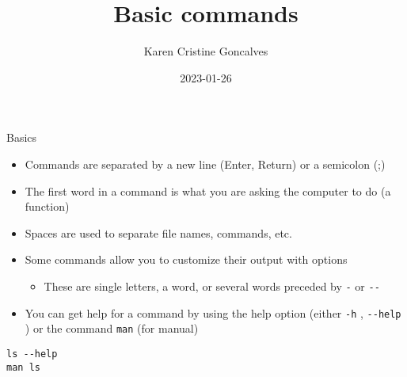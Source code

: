 \documentclass[
  ignorenonframetext,
]{beamer}
\title{Basic commands}
\author{Karen Cristine Goncalves}
\date{2023-01-26}
\providecommand{\tightlist}{%
  \setlength{\itemsep}{0pt}\setlength{\parskip}{0pt}}
\begin{document}
\frame{\titlepage}

\begin{frame}
\end{frame}

\begin{frame}[fragile]{Basics}
\protect\hypertarget{slide1}{}
\begin{itemize}[<+->]
\tightlist
\item
  Commands are separated by a new line (Enter, Return) or a semicolon
  (;)
\item
  The first word in a command is what you are asking the computer to do
  (a function)
\item
  Spaces are used to separate file names, commands, etc.
\item
  Some commands allow you to customize their output with options

  \begin{itemize}[<+->]
  \tightlist
  \item
    These are single letters, a word, or several words preceded by
    \texttt{-} or \texttt{-\/-}
  \end{itemize}
\item
  You can get help for a command by using the help option (either
  \texttt{-h} , \texttt{-\/-help} ) or the command \texttt{man} (for
  manual)
\end{itemize}

\begin{block}{}
\protect\hypertarget{section}{}
\begin{verbatim}
ls --help
man ls
\end{verbatim}
\end{block}

\begin{block}{}
\protect\hypertarget{section-1}{}
\end{block}
\end{frame}
\end{document}
